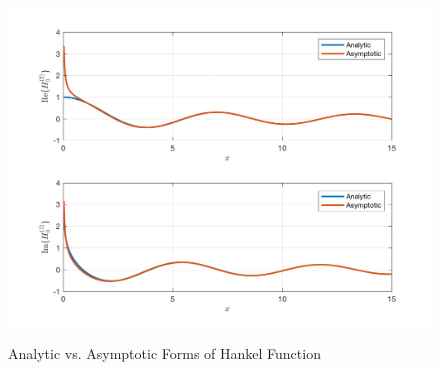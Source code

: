 \begin{figure}[ht]
  \begin{center}
\includegraphics[width=5in]{../media/hankel_error.png}
\end{center}
  \renewcommand{\baselinestretch}{1}\small\normalsize
  \begin{quote}
    \caption[Analytic vs. Asymptotic Forms of Hankel Function]{Analytic vs. Asymptotic Forms of Hankel Function\label{sp_fig:3}}
  \end{quote}
\end{figure}
\renewcommand{\baselinestretch}{2} \small\normalsize
